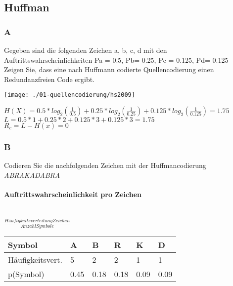\subsection{Huffman}
\subsubsection{A}
Gegeben sind die folgenden Zeichen a, b, c, d mit den Auftrittswahrscheinlichkeiten 
P{a} = 0.5, P{b}= 0.25, P{c} = 0.125, P{d}= 0.125\\

Zeigen Sie, dass eine nach Huffmann codierte Quellencodierung einen Redundanzfreien 
Code ergibt.
\begin{center}
    \vspace{-8pt}
    \texttt{[image: ./01-quellencodierung/hs2009]}
    \vspace{-8pt}
\end{center}

$H(X) = 0.5*log_2(\frac{1}{0.5})+0.25*log_2(\frac{1}{0.25})+0.125*log_2(\frac{1}{0.125})=1.75$\\
$L=0.5*1+0.25*2+0.125*3+0.125*3=1.75$\\
$R_c=L-H(x)=0$

\subsubsection{B}
Codieren Sie die nachfolgenden Zeichen mit der Huffmancodierung\\
\textit{ABRAKADABRA}\\

\paragraph{Auftrittswahrscheinlichkeit pro Zeichen}\mbox{}\\
$\frac{Häufigkeitsverteilung Zeichen}{Anzahl Symbole}$

\begin{center}
    \centering
    \begin{tabular}{p{1.9cm} | p{0.5cm} | p{0.5cm} | p{0.5cm} | p{0.5cm} | p{0.5cm} }
        \bfseries{Symbol} & \bfseries{A} & \bfseries{B} & \bfseries{R} & \bfseries{K} & \bfseries{D}\\ \hline
        Häufigkeitsvert. & 5 & 2 & 2 & 1 & 1\\ 
        p(Symbol) & 0.45 & 0.18 & 0.18 & 0.09 & 0.09
    \end{tabular}
\end{center}

